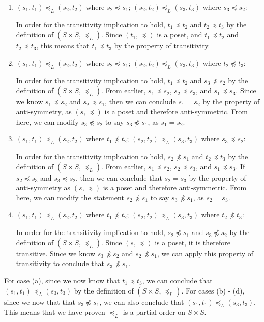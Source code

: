 \documentclass{article}
\begin{document}
\begin{enumerate}
\begin{enumerate}

\item $(s_1, t_1) \preceq_{L} (s_2, t_2)$ where $s_2 \preceq s_1$; $(s_2, t_2) \preceq_{L} (s_3, t_3)$ where $s_3 \preceq s_2$:

In order for the transitivity implication to hold, $t_1 \preceq t_2$ and $t_2 \preceq t_3$ by the definition of $(S \times S, \preceq_{L})$. Since $(t_1, \preceq)$ is a poset, and $t_1 \preceq t_2$ and $t_2 \preceq t_3$, this means that $t_1 \preceq t_3$ by the property of transitivity.

\item $(s_1, t_1) \preceq_{L} (s_2, t_2)$ where $s_2 \preceq s_1$; $(s_2, t_2) \preceq_{L} (s_3, t_3)$ where $t_2 \npreceq t_3$:

In order for the transitivity implication to hold, $t_1 \preceq t_2$ and $s_3 \npreceq s_2$ by the definition of $(S \times S, \preceq_{L})$. From earlier, $s_1 \preceq s_2$, $s_2 \preceq s_3$, and $s_1 \preceq s_3$. Since we know $s_1 \preceq s_2$ and $s_2 \preceq s_1$, then we can conclude $s_1 = s_2$ by the property of anti-symmetry, as $(s, \preceq)$ is a poset and therefore anti-symmetric. From here, we can modify $s_3 \npreceq s_2$ to say $s_3 \npreceq s_1$, as $s_1 = s_2$.

\item $(s_1, t_1) \preceq_{L} (s_2, t_2)$ where $t_1 \npreceq t_2$; $(s_2, t_2) \preceq_{L} (s_3, t_3)$ where $s_3 \preceq s_2$:

In order for the transitivity implication to hold, $s_2 \npreceq s_1$ and $t_2 \preceq t_3$ by the definition of $(S \times S, \preceq_{L})$. From earlier, $s_1 \preceq s_2$, $s_2 \preceq s_3$, and $s_1 \preceq s_3$. If $s_2 \preceq s_3$ and $s_3 \preceq s_2$, then we can conclude that $s_2 = s_3$ by the property of anti-symmetry as $(s, \preceq)$ is a poset and therefore anti-symmetric. From here, we can modify the statement $s_2 \npreceq s_1$ to say $s_3 \npreceq s_1$, as $s_2 = s_3$.

\item $(s_1, t_1) \preceq_{L} (s_2, t_2)$ where $t_1 \npreceq t_2$; $(s_2, t_2) \preceq_{L} (s_3, t_3)$ where $t_2 \npreceq t_3$:

In order for the transitivity implication to hold, $s_2 \npreceq s_1$ and $s_3 \npreceq s_2$ by the definition of $(S \times S, \preceq_{L})$. Since $(s, \preceq)$ is a poset, it is therefore transitive. Since we know $s_3 \npreceq s_2$ and $s_2 \npreceq s_1$, we can apply this property of transitivity to conclude that $s_3 \npreceq s_1$.

\end{enumerate}

\end{enumerate}

For case (a), since we now know that $t_1 \preceq t_3$, we can conclude that $(s_1, t_1) \preceq_{L} (s_3, t_3)$ by the definition of $(S \times S, \preceq_{L})$. For cases (b) - (d), since we now that that $s_3 \npreceq s_1$, we can also conclude that $(s_1, t_1) \preceq_{L} (s_3, t_3)$. This means that we have proven $\preceq_{L}$ is a partial order on $S \times S$.
\end{document}
